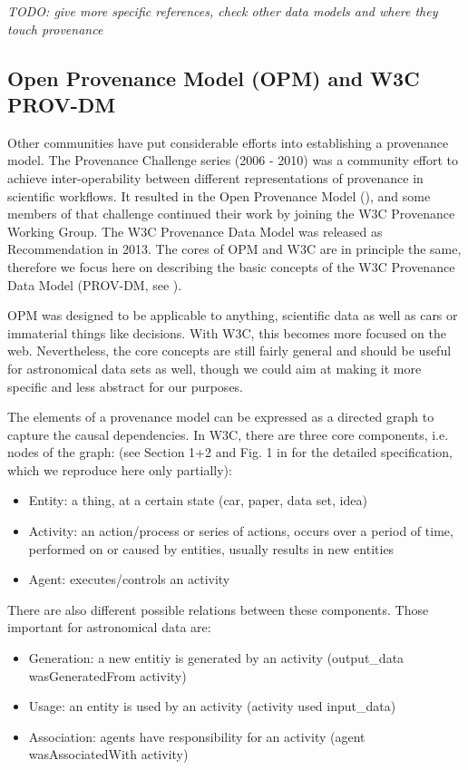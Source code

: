 \documentclass[11pt,a4paper]{ivoa}
\begin{document}
\emph{TODO: give more specific references, check other data models and where they touch provenance}


\subsection{Open Provenance Model (OPM) and W3C PROV-DM}

Other communities have put considerable efforts into establishing a provenance model.
The Provenance Challenge series (2006 - 2010) was a community effort to achieve inter-operability between different representations of provenance in scientific workflows. It resulted in the Open Provenance Model (\cite{moreau2010}), and some members of that challenge continued their work by joining the W3C Provenance Working Group. The W3C Provenance Data Model was released as Recommendation in 2013. The cores of OPM and W3C are in principle the same, therefore we focus here on describing the basic concepts of the W3C Provenance Data Model (PROV-DM, see \cite{std:W3CProvDM}).


OPM was designed to be applicable to anything, scientific data as well as cars or immaterial things like decisions. With W3C, this becomes more focused on the web. Nevertheless, the core concepts are still fairly general and should be useful for astronomical data sets as well, though we could aim at making it more specific and less abstract for our purposes. 

The elements of a provenance model can be expressed as a directed graph to capture the causal dependencies. In W3C, there are three core components, i.e. nodes of the graph:
(see Section 1+2 and Fig. 1 in \cite{std:W3CProvDM} for the detailed specification, which we reproduce here only partially):

\begin{itemize}
\item Entity: a thing, at a certain state (car, paper, data set, idea)
\item Activity: an action/process or series of actions, occurs over a period of time, performed on or caused by entities, usually results in new entities
\item Agent: executes/controls an activity
\end{itemize}

There are also different possible relations between these components. Those important for astronomical data are:
\begin{itemize}
\item Generation: a new entitiy is generated by an activity (output\_data wasGeneratedFrom activity)
\item Usage: an entity is used by an activity (activity used input\_data)
\item Association: agents have responsibility for an activity (agent wasAssociatedWith activity)
\end{itemize}
\end{document}
